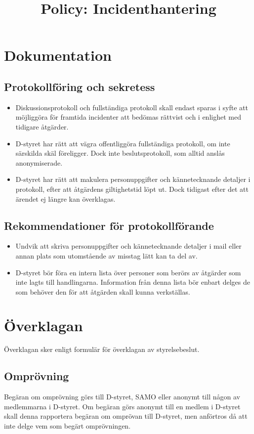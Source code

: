 \documentclass{dtek}
\title{Policy: Incidenthantering}
\begin{document}
\maketitle





\section{Dokumentation}
\subsection{Protokollföring och sekretess}
\begin{itemize}
  \item Diskussionsprotokoll och fullständiga protokoll skall endast sparas i syfte att möjliggöra för framtida incidenter att bedömas rättvist och i enlighet med tidigare åtgärder.
  \item D-styret har rätt att vägra offentliggöra fullständiga protokoll, om inte särskilda skäl föreligger. Dock inte beslutsprotokoll, som alltid anslås anonymiserade.
  \item D-styret har rätt att makulera personuppgifter och kännetecknande detaljer i protokoll, efter att åtgärdens giltighetstid löpt ut. Dock tidigast efter det att ärendet ej längre kan överklagas.
  \end{itemize}
\subsection{Rekommendationer för protokollförande}
\begin{itemize}
  \item Undvik att skriva personuppgifter och kännetecknande detaljer i mail eller annan plats som utomstående av misstag lätt kan ta del av.
  \item D-styret bör föra en intern lista över personer som berörs av åtgärder som inte lagts till handlingarna. Information från denna lista bör enbart delges de som behöver den för att åtgärden skall kunna verkställas.
\end{itemize}

\section{Överklagan}
Överklagan sker enligt formulär för överklagan av styrelsebeslut.
\subsection{Omprövning}
  Begäran om omprövning görs till D-styret, SAMO eller anonymt till någon av medlemmarna i D-styret. Om begäran görs anonymt till en medlem i D-styret skall denna rapportera begäran om omprövan till D-styret, men anförtros då att inte delge vem som begärt omprövningen.
\end{document}
